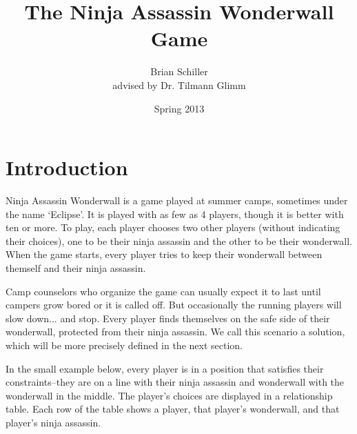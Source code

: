 \documentclass[12pt,x11names, rgb]{article}
\title{The Ninja Assassin Wonderwall Game}
\author{Brian Schiller \\ { advised by Dr. Tilmann Glimm}}
\date{Spring 2013}
\begin{document}
\maketitle

\tableofcontents

\section{Introduction}
    Ninja Assassin Wonderwall is a game played at summer camps, sometimes under the name `Eclipse'. It is played with as few as 4 players, though it is better with ten or more. To play, each player chooses two other players (without indicating their choices), one to be their ninja assassin and the other to be their wonderwall. When the game starts, every player tries to keep their wonderwall between themself and their ninja assassin.

    Camp counselors who organize the game can usually expect it to last until campers grow bored or it is called off. But occasionally the running players will slow down... and stop. Every player finds themselves on the safe side of their wonderwall, protected from their ninja assassin. We call this scenario a solution, which will be more precisely defined in the next section.

    In the small example below, every player is in a position that satisfies their constraints--they are on a line with their ninja assassin and wonderwall with the wonderwall in the middle. The player's choices are displayed in a relationship table. Each row of the table shows a player, that player's wonderwall, and that player's ninja assassin.
\end{document}

